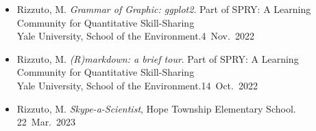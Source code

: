 
\begin{itemize}
  \item \textcolor{awesome}{Rizzuto, M.} \emph{Grammar of Graphic: ggplot2}. Part of SPRY: A Learning Community for Quantitative Skill-Sharing\\ Yale University, School of the Environment.\hfill 4~Nov.~2022
  \item \textcolor{awesome}{Rizzuto, M.} \emph{(R)markdown: a brief tour}. Part of SPRY: A Learning Community for Quantitative Skill-Sharing\\ Yale University, School of the Environment.\hfill 14~Oct.~2022
\end{itemize}

\begin{itemize}
  \item \textcolor{awesome}{Rizzuto, M.} \emph{Skype-a-Scientist}, Hope Township Elementary School. \hfill 22~Mar.~2023
\end{itemize}

